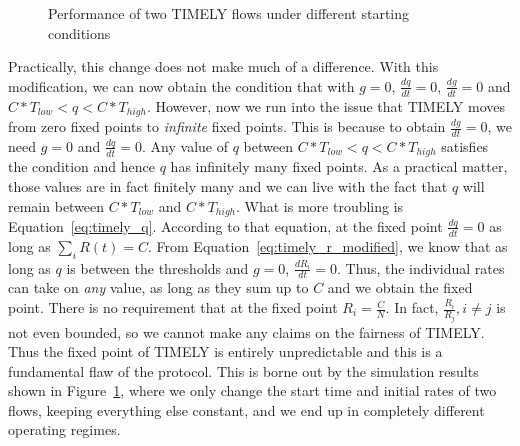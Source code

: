 \begin{figure}[t]
\center
{}
\caption{Performance of two TIMELY flows under different starting conditions}
\label{fig:timely_unstable}
\end{figure}

Practically, this change does not make much of a difference. With this
modification, we can now obtain the condition that with $g =0$, $\tfrac{dq}{dt}
= 0$, $\tfrac{dg}{dt} = 0$ and $C*T_{low} < q < C*T_{high}$. However, now we run
into the issue that TIMELY moves from zero fixed points to \emph{infinite} fixed
points. This is because to obtain $\tfrac{dg}{dt} =0$, we need $g = 0$ and
$\tfrac{dq}{dt} = 0$. Any value of $q$ between $C*T_{low} < q < C*T_{high}$
satisfies the condition and hence $q$ has infinitely many fixed points. As a
practical matter, those values are in fact finitely many and we can live with
the fact that $q$ will remain between $C*T_{low}$ and $C*T_{high}$. What is more
troubling is Equation~\ref{eq:timely_q}. According to that equation, at the
fixed point $\tfrac{dq}{dt} = 0$ as long as $\sum_{i} R(t) =  C$. From
Equation~\ref{eq:timely_r_modified}, we know that as long as $q$ is between the
thresholds and $g=0$, $\tfrac{dR_i}{dt} = 0$. Thus, the individual rates can
take on \emph{any} value, as long as they sum up to $C$ and we obtain the fixed
point. There is no requirement that at the fixed point $R_i = \tfrac{C}{N}$. In
fact, $\tfrac{R_{i}}{R_{j}}, i \ne j$ is not even bounded, so we cannot make any
claims on the fairness of TIMELY. Thus the fixed point of TIMELY is entirely
unpredictable and this is a fundamental flaw of the protocol. This is borne out
by the simulation results shown in Figure~\ref{fig:timely_unstable}, where we
only change the start time and initial rates of two flows, keeping everything
else constant, and we end up in completely different operating regimes.


